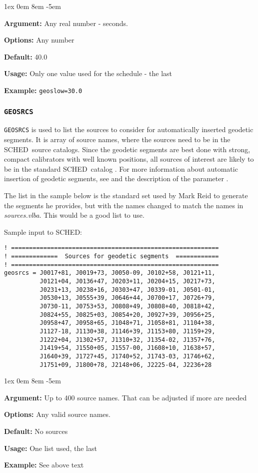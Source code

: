 \documentclass{report}
\newcommand{\sched}{{\sc SCHED}}
\newcommand{\schedb}{{\sc SCHED~}}
\newcommand{\rcwbox}[5]{
  \begin{list}{}{\parsep 1ex  \itemsep 0em
                 \leftmargin 8em  \itemindent -5em }
    \item {\bf Argument:} #1
    \item {\bf Options:}  #2
    \item {\bf Default:}  #3
    \item {\bf Usage:}    #4
    \item {\bf Example:}  #5
  \end{list}
}
\begin{document}
\rcwbox
{Any real number - seconds.}
{Any number}
{40.0}
{Only one value used for the schedule - the last}
{{\tt geoslow=30.0}}

\subsubsection{\label{MP:GEOSRCS}{\tt GEOSRCS}}

{\tt GEOSRCS} is used to list the sources to consider for
automatically inserted geodetic segments.  It is array of source
names, where the sources need to be in the \schedb source catalogs.
Since the geodetic segments are best done with strong, compact
calibrators with well known positions, all sources of interest are
likely to be in the standard \schedb catalog .  For more
information about automatic insertion of geodetic segments, see
and the description of the parameter .

The list in the sample below is the standard set used by Mark Reid
to generate the segments he provides, but with the names changed
to match the names in {\sl sources.vlba}.  This would be a good list
to use.

Sample input to \sched:

\begin{verbatim}
! ==========================================================
! =============  Sources for geodetic segments  ============
! ==========================================================
geosrcs = J0017+81, J0019+73, J0050-09, J0102+58, J0121+11,
          J0121+04, J0136+47, J0203+11, J0204+15, J0217+73,
          J0231+13, J0238+16, J0303+47, J0339-01, J0501-01,
          J0530+13, J0555+39, J0646+44, J0700+17, J0726+79,
          J0730-11, J0753+53, J0808+49, J0808+40, J0818+42,
          J0824+55, J0825+03, J0854+20, J0927+39, J0956+25,
          J0958+47, J0958+65, J1048+71, J1058+81, J1104+38,
          J1127-18, J1130+38, J1146+39, J1153+80, J1159+29,
          J1222+04, J1302+57, J1310+32, J1354-02, J1357+76,
          J1419+54, J1550+05, J1557-00, J1608+10, J1638+57,
          J1640+39, J1727+45, J1740+52, J1743-03, J1746+62,
          J1751+09, J1800+78, J2148+06, J2225-04, J2236+28

\end{verbatim}

\rcwbox
{Up to 400 source names.  That can be adjusted if more are needed}
{Any valid source names.}
{No sources}
{One list used, the last}
{See above text}
\end{document}
